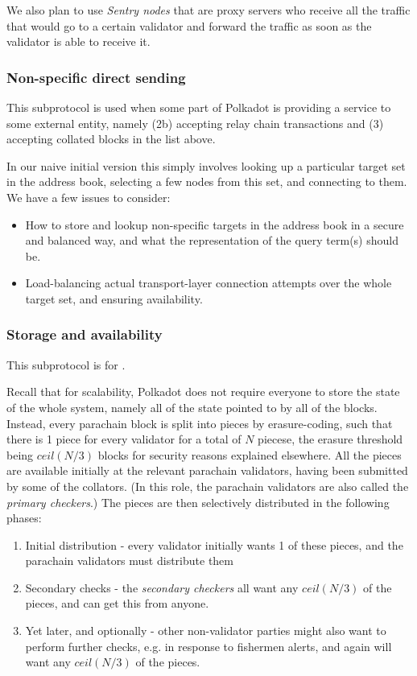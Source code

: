 We also plan to use \emph{Sentry nodes} that are proxy servers who receive all the traffic that would go to a certain validator and forward the traffic as soon as the validator is able to receive it.

\subsubsection{Non-specific direct sending} \label{sec:net_service}

This subprotocol is used when some part of Polkadot is providing a service to some external entity, namely (2b) accepting relay chain transactions and (3) accepting collated blocks in the list above.

In our naive initial version this simply involves looking up a particular target set in the address book, selecting a few nodes from this set, and connecting to them. We have a few issues to consider:

\begin{itemize}
\item How to store and lookup non-specific targets in the address book in a secure and balanced way, and what the representation of the query term(s) should be.
\item Load-balancing actual transport-layer connection attempts over the whole target set, and ensuring availability.
\end{itemize}

\subsubsection{Storage and availability} \label{sec:net_storage}

This subprotocol is for .

Recall that for scalability, Polkadot does not require everyone to store the state of the whole system, namely all of the state pointed to by all of the blocks. Instead, every parachain block is split into pieces by erasure-coding, such that there is 1 piece for every validator for a total of $N$ piecese, the erasure threshold being $ceil(N/3)$ blocks for security reasons explained elsewhere. All the pieces are available initially at the relevant parachain validators, having been submitted by some of the collators. (In this role, the parachain validators are also called the \emph{primary checkers}.) The pieces are then selectively distributed in the following phases:

\begin{enumerate}
\item Initial distribution - every validator initially wants 1 of these pieces, and the parachain validators must distribute them
\item Secondary checks - the \emph{secondary checkers} all want any $ceil(N/3)$ of the pieces, and can get this from anyone.
\item Yet later, and optionally - other non-validator parties might also want to perform further checks, e.g. in response to fishermen alerts, and again will want any $ceil(N/3)$ of the pieces.
\end{enumerate}

